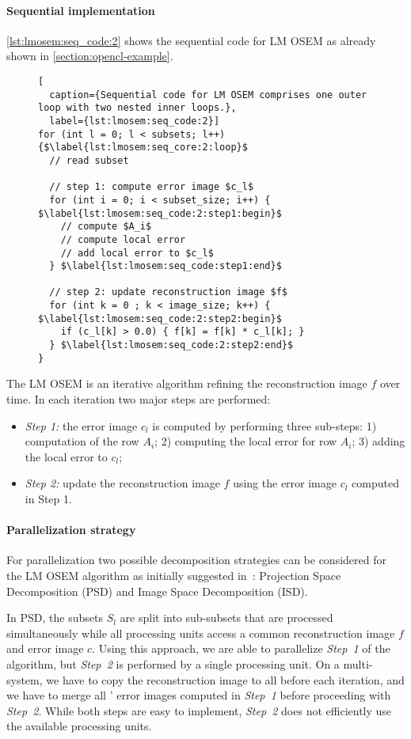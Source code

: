 \paragraph{Sequential implementation}
\autoref{lst:lmosem:seq_code:2} shows the sequential code for LM OSEM as already shown in \autoref{section:opencl-example}.
%
\begin{figure}
\begin{lstlisting}[
  caption={Sequential code for LM OSEM comprises one outer loop with two nested inner loops.},
  label={lst:lmosem:seq_code:2}]
for (int l = 0; l < subsets; l++) {$\label{lst:lmosem:seq_core:2:loop}$
  // read subset

  // step 1: compute error image $c_l$
  for (int i = 0; i < subset_size; i++) { $\label{lst:lmosem:seq_code:2:step1:begin}$
    // compute $A_i$
    // compute local error
    // add local error to $c_l$
  } $\label{lst:lmosem:seq_code:step1:end}$

  // step 2: update reconstruction image $f$
  for (int k = 0 ; k < image_size; k++) { $\label{lst:lmosem:seq_code:2:step2:begin}$
    if (c_l[k] > 0.0) { f[k] = f[k] * c_l[k]; }
  } $\label{lst:lmosem:seq_code:2:step2:end}$
}
\end{lstlisting}
\end{figure}
%
The LM OSEM is an iterative algorithm refining the reconstruction image $f$ over time.
In each iteration two major steps are performed:
\begin{itemize}
  \item[] \emph{Step 1:} the error image $c_l$ is computed by performing three sub-steps: 1) computation of the row $A_i$; 2) computing the local error for row $A_i$; 3) adding the local error to $c_l$;
  \item[] \emph{Step 2:} update the reconstruction image $f$ using the error image $c_l$ computed in Step 1.
\end{itemize}

\paragraph{Parallelization strategy}
For parallelization two possible decomposition strategies can be considered for the LM OSEM algorithm as initially suggested in~\cite{JonesJoKeNeReLeByBaMiCa2002}: Projection Space Decomposition (PSD) and Image Space Decomposition (ISD).

In PSD, the subsets $S_l$ are split into sub-subsets that are processed simultaneously while all processing units access a common reconstruction image $f$ and error image $c$.
Using this approach, we are able to parallelize \emph{Step~1} of the algorithm, but \emph{Step~2} is performed by a single processing unit.
On a multi-\GPU system, we have to copy the reconstruction image to all \GPUs before each iteration, and we have to merge all \GPUs' error images computed in \emph{Step~1} before proceeding with \emph{Step~2}.
While both steps are easy to implement, \emph{Step~2} does not efficiently use the available processing units.

